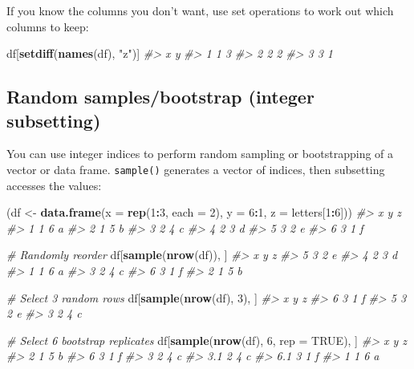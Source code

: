\documentclass[]{book}
\newenvironment{Shaded}{\begin{snugshade}}{\end{snugshade}}
\newcommand{\KeywordTok}[1]{\textcolor[rgb]{0.13,0.29,0.53}{\textbf{#1}}}
\newcommand{\DataTypeTok}[1]{\textcolor[rgb]{0.13,0.29,0.53}{#1}}
\newcommand{\DecValTok}[1]{\textcolor[rgb]{0.00,0.00,0.81}{#1}}
\newcommand{\StringTok}[1]{\textcolor[rgb]{0.31,0.60,0.02}{#1}}
\newcommand{\CommentTok}[1]{\textcolor[rgb]{0.56,0.35,0.01}{\textit{#1}}}
\newcommand{\OtherTok}[1]{\textcolor[rgb]{0.56,0.35,0.01}{#1}}
\newcommand{\OperatorTok}[1]{\textcolor[rgb]{0.81,0.36,0.00}{\textbf{#1}}}
\newcommand{\NormalTok}[1]{#1}
\theoremstyle{definition}
\theoremstyle{definition}
\theoremstyle{definition}
\theoremstyle{remark}
\begin{document}
If you know the columns you don't want, use set operations to work out
which columns to keep:

\begin{Shaded}
\begin{Highlighting}[]
\NormalTok{df[}\KeywordTok{setdiff}\NormalTok{(}\KeywordTok{names}\NormalTok{(df), }\StringTok{"z"}\NormalTok{)]}
\CommentTok{#>   x y}
\CommentTok{#> 1 1 3}
\CommentTok{#> 2 2 2}
\CommentTok{#> 3 3 1}
\end{Highlighting}
\end{Shaded}

\subsection{Random samples/bootstrap (integer
subsetting)}\label{random-samplesbootstrap-integer-subsetting}

You can use integer indices to perform random sampling or bootstrapping
of a vector or data frame. \texttt{sample()} generates a vector of
indices, then subsetting accesses the values:

\begin{Shaded}
\begin{Highlighting}[]
\NormalTok{(df <-}\StringTok{ }\KeywordTok{data.frame}\NormalTok{(}\DataTypeTok{x =} \KeywordTok{rep}\NormalTok{(}\DecValTok{1}\OperatorTok{:}\DecValTok{3}\NormalTok{, }\DataTypeTok{each =} \DecValTok{2}\NormalTok{), }\DataTypeTok{y =} \DecValTok{6}\OperatorTok{:}\DecValTok{1}\NormalTok{, }\DataTypeTok{z =}\NormalTok{ letters[}\DecValTok{1}\OperatorTok{:}\DecValTok{6}\NormalTok{]))}
\CommentTok{#>   x y z}
\CommentTok{#> 1 1 6 a}
\CommentTok{#> 2 1 5 b}
\CommentTok{#> 3 2 4 c}
\CommentTok{#> 4 2 3 d}
\CommentTok{#> 5 3 2 e}
\CommentTok{#> 6 3 1 f}

\CommentTok{# Randomly reorder}
\NormalTok{df[}\KeywordTok{sample}\NormalTok{(}\KeywordTok{nrow}\NormalTok{(df)), ]}
\CommentTok{#>   x y z}
\CommentTok{#> 5 3 2 e}
\CommentTok{#> 4 2 3 d}
\CommentTok{#> 1 1 6 a}
\CommentTok{#> 3 2 4 c}
\CommentTok{#> 6 3 1 f}
\CommentTok{#> 2 1 5 b}

\CommentTok{# Select 3 random rows}
\NormalTok{df[}\KeywordTok{sample}\NormalTok{(}\KeywordTok{nrow}\NormalTok{(df), }\DecValTok{3}\NormalTok{), ]}
\CommentTok{#>   x y z}
\CommentTok{#> 6 3 1 f}
\CommentTok{#> 5 3 2 e}
\CommentTok{#> 3 2 4 c}

\CommentTok{# Select 6 bootstrap replicates}
\NormalTok{df[}\KeywordTok{sample}\NormalTok{(}\KeywordTok{nrow}\NormalTok{(df), }\DecValTok{6}\NormalTok{, }\DataTypeTok{rep =} \OtherTok{TRUE}\NormalTok{), ]}
\CommentTok{#>     x y z}
\CommentTok{#> 2   1 5 b}
\CommentTok{#> 6   3 1 f}
\CommentTok{#> 3   2 4 c}
\CommentTok{#> 3.1 2 4 c}
\CommentTok{#> 6.1 3 1 f}
\CommentTok{#> 1   1 6 a}
\end{Highlighting}
\end{Shaded}
\end{document}
